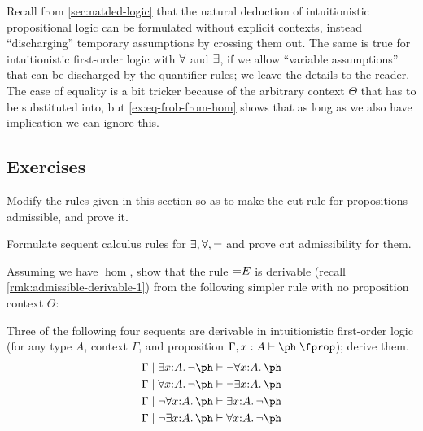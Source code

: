 \begin{rmk}
  Recall from \cref{sec:natded-logic} that the natural deduction of intuitionistic propositional logic can be formulated without explicit contexts, instead ``discharging'' temporary assumptions by crossing them out.
  The same is true for intuitionistic first-order logic with $\all$ and $\exis$, if we allow ``variable assumptions'' that can be discharged by the quantifier rules; we leave the details to the reader.
  The case of equality is a bit tricker because of the arbitrary context $\Theta$ that has to be substituted into, but \cref{ex:eq-frob-from-hom} shows that as long as we also have implication we can ignore this.
\end{rmk}

\subsection*{Exercises}

\begin{ex}\label{ex:fol:cutadm}
  Modify the rules given in this section so as to make the cut rule for propositions admissible, and prove it.
\end{ex}

\begin{ex}\label{ex:fol-seqcalc}
  Formulate sequent calculus rules for $\exis,\all,=$ and prove cut admissibility for them.
\end{ex}

\begin{ex}\label{ex:eq-frob-from-hom}
  Assuming we have $\hom$, show that the rule $\eqE$ is derivable (recall \cref{rmk:admissible-derivable-1}) from the following simpler rule with no proposition context $\Theta$:
  \begin{mathpar}
  \end{mathpar}
\end{ex}

\begin{ex}\label{ex:quantifier-laws}
  Three of the following four sequents are derivable in intuitionistic first-order logic (for any type $A$,  context $\Gamma$, and proposition $\Gamma,x:A\types\ph\prop$); derive them.
  \begin{align*}
    \Gamma \cb \exists x:A. \neg \ph &\types \neg\forall x:A. \ph\\
    \Gamma \cb \forall x:A. \neg \ph &\types \neg\exists x:A. \ph\\
    \Gamma \cb \neg\forall x:A. \ph &\types \exists x:A. \neg \ph\\
    \Gamma \cb \neg\exists x:A. \ph &\types \forall x:A. \neg \ph
  \end{align*}
\end{ex}

